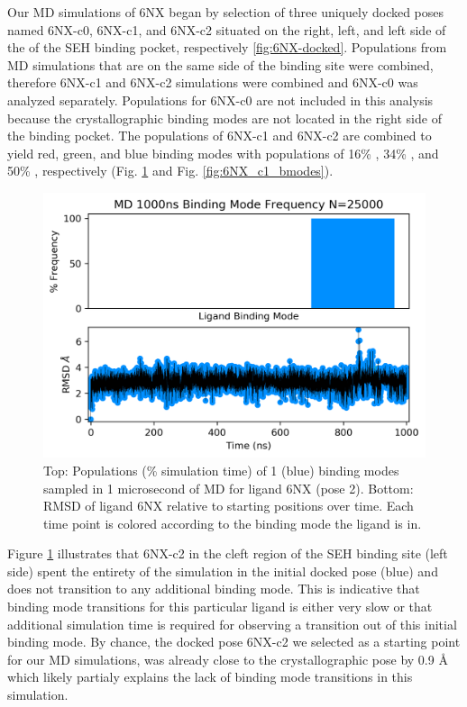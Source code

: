 Our MD simulations of 6NX began by selection of three uniquely docked poses named 6NX-c0, 6NX-c1, and 6NX-c2 situated on the right, left, and left side of the of the SEH binding pocket, respectively \ref{fig:6NX-docked}. 
Populations from MD simulations that are on the same side of the binding site were combined, therefore 6NX-c1 and 6NX-c2 simulations were combined and 6NX-c0 was analyzed separately.
Populations for 6NX-c0 are not included in this analysis because the crystallographic binding modes are not located in the right side of the binding pocket.
The populations of 6NX-c1 and 6NX-c2 are combined to yield red, green, and blue binding modes with populations of 16\% , 34\% , and 50\% , respectively (Fig. \ref{fig:6NX_c2_bmodes} and Fig. \ref{fig:6NX_c1_bmodes}). 

\begin{figure}
    \centering
    \includegraphics[width=\linewidth]{chapter5/6NX/6NX_1_c2-full-bmodes-freq.png}
    \caption[Ligand 6NX pose 2 Binding Mode Populations]{Top: Populations (\% simulation time) of 1 (blue) binding modes sampled in 1 microsecond of MD for ligand 6NX (pose 2). Bottom: RMSD of ligand 6NX relative to starting positions over time. Each time point is colored according to the binding mode the ligand is in.}
    \label{fig:6NX_c2_bmodes}
\end{figure}
Figure \ref{fig:6NX_c2_bmodes} illustrates that 6NX-c2 in the cleft region of the SEH binding site (left side) spent the entirety of the simulation in the initial docked pose (blue) and does not transition to any additional binding mode.
This is indicative that binding mode transitions for this particular ligand is either very slow or that additional simulation time is required for observing a transition out of this initial binding mode.
By chance, the docked pose 6NX-c2 we selected as a starting point for our MD simulations, was already close to the crystallographic pose by 0.9 {\AA} which likely partialy explains the lack of binding mode transitions in this simulation.


